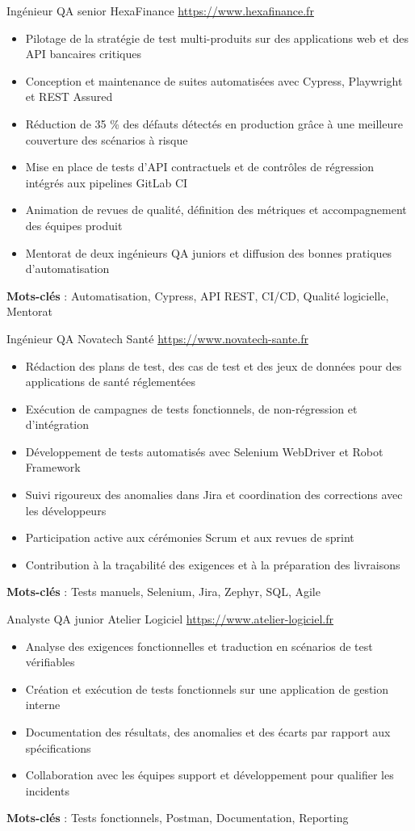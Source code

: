 \documentclass[a4paper, serif, 10pt]{moderncv}
\begin{document}
        {Ingénieur QA senior}
        {HexaFinance}
        {\url{https://www.hexafinance.fr}}
        {}
        {\begin{itemize}
\item Pilotage de la stratégie de test multi-produits sur des applications web et des API bancaires critiques
\item Conception et maintenance de suites automatisées avec Cypress, Playwright et REST Assured
\item Réduction de 35 \% des défauts détectés en production grâce à une meilleure couverture des scénarios à risque
\item Mise en place de tests d'API contractuels et de contrôles de régression intégrés aux pipelines GitLab CI
\item Animation de revues de qualité, définition des métriques et accompagnement des équipes produit
\item Mentorat de deux ingénieurs QA juniors et diffusion des bonnes pratiques d'automatisation
\end{itemize}
\textbf{Mots-clés} : Automatisation, Cypress, API REST, CI/CD, Qualité logicielle, Mentorat}

        {Ingénieur QA}
        {Novatech Santé}
        {\url{https://www.novatech-sante.fr}}
        {}
        {\begin{itemize}
\item Rédaction des plans de test, des cas de test et des jeux de données pour des applications de santé réglementées
\item Exécution de campagnes de tests fonctionnels, de non-régression et d'intégration
\item Développement de tests automatisés avec Selenium WebDriver et Robot Framework
\item Suivi rigoureux des anomalies dans Jira et coordination des corrections avec les développeurs
\item Participation active aux cérémonies Scrum et aux revues de sprint
\item Contribution à la traçabilité des exigences et à la préparation des livraisons
\end{itemize}
\textbf{Mots-clés} : Tests manuels, Selenium, Jira, Zephyr, SQL, Agile}

        {Analyste QA junior}
        {Atelier Logiciel}
        {\url{https://www.atelier-logiciel.fr}}
        {}
        {\begin{itemize}
\item Analyse des exigences fonctionnelles et traduction en scénarios de test vérifiables
\item Création et exécution de tests fonctionnels sur une application de gestion interne
\item Documentation des résultats, des anomalies et des écarts par rapport aux spécifications
\item Collaboration avec les équipes support et développement pour qualifier les incidents
\end{itemize}
\textbf{Mots-clés} : Tests fonctionnels, Postman, Documentation, Reporting}
\end{document}

